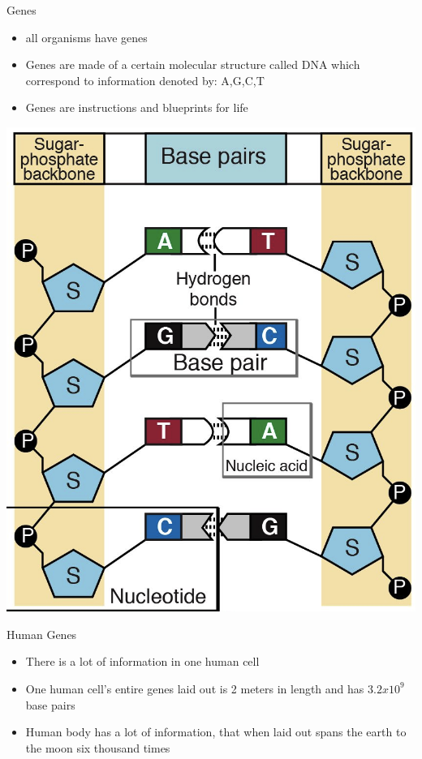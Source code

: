 \documentclass{beamer}
\begin{document}
\begin{frame}{Genes}
  \begin{itemize}   
    \item all organisms have genes
    \item Genes are made of a certain molecular structure called DNA which correspond to information denoted by: A,G,C,T
    \item Genes are instructions and blueprints for life
  \end{itemize}
\centering
\includegraphics[scale=0.1]{gene-base-pair.png}
\end{frame}

\begin{frame}{Human Genes}
  \begin{itemize}   
    \item There is a lot of information in one human cell
    \item One human cell's entire genes laid out is 2 meters in length \cite{ency_sci_tech} and has $3.2x10^9$ base pairs \cite{introgenomics}
    \item Human body has a lot of information, that when laid out spans the earth to the moon six thousand times
\end{itemize}
\end{frame}
\end{document}
